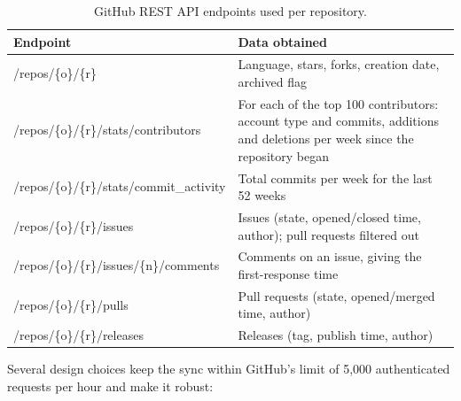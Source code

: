 \documentclass[11pt,a4paper]{report}
\begin{document}
\begin{table}[H]
\centering
\caption{GitHub REST API endpoints used per repository.}
\label{tab:endpoints}
\small
\begin{tabularx}{\textwidth}{>{\ttfamily}l X}
\toprule
\textrm{\textbf{Endpoint}} & \textbf{Data obtained} \\
\midrule
/repos/\{o\}/\{r\} & Language, stars, forks, creation date, archived flag \\
/repos/\{o\}/\{r\}/stats/contributors & For each of the top 100 contributors: account type and commits, additions and deletions per week since the repository began \\
/repos/\{o\}/\{r\}/stats/commit\_activity & Total commits per week for the last 52 weeks \\
/repos/\{o\}/\{r\}/issues & Issues (state, opened/closed time, author); pull requests filtered out \\
/repos/\{o\}/\{r\}/issues/\{n\}/comments & Comments on an issue, giving the first-response time \\
/repos/\{o\}/\{r\}/pulls & Pull requests (state, opened/merged time, author) \\
/repos/\{o\}/\{r\}/releases & Releases (tag, publish time, author) \\
\bottomrule
\end{tabularx}
\end{table}

Several design choices keep the sync within GitHub's limit of 5,000
authenticated requests per hour and make it robust:
\end{document}
